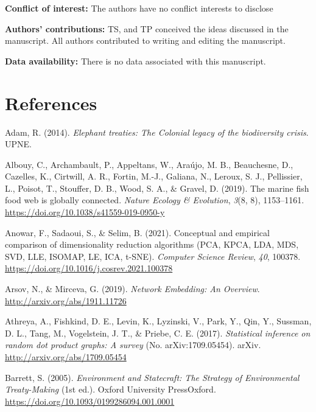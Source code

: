 \documentclass[11pt]{article}
\newlength{\cslhangindent}
\newenvironment{CSLReferences}[2] %
 {%
  \setlength{\parindent}{0pt}
  \ifodd #1 \everypar{\setlength{\hangindent}{\cslhangindent}}\ignorespaces\fi
  \ifnum #2 > 0
  \setlength{\parskip}{#2\baselineskip}
  \fi
 }%
 {}
\begin{document}
\textbf{Conflict of interest:} The authors have no conflict interests to
disclose

\textbf{Authors' contributions:} TS, and TP conceived the ideas
discussed in the manuscript. All authors contributed to writing and
editing the manuscript.

\textbf{Data availability:} There is no data associated with this
manuscript.

\hypertarget{references}{%
\section*{References}\label{references}}

\hypertarget{refs}{}
\begin{CSLReferences}{1}{0}
\leavevmode{}%
Adam, R. (2014). \emph{Elephant treaties: The Colonial legacy of the
biodiversity crisis}. UPNE.

\leavevmode{}%
Albouy, C., Archambault, P., Appeltans, W., Araújo, M. B., Beauchesne,
D., Cazelles, K., Cirtwill, A. R., Fortin, M.-J., Galiana, N., Leroux,
S. J., Pellissier, L., Poisot, T., Stouffer, D. B., Wood, S. A., \&
Gravel, D. (2019). The marine fish food web is globally connected.
\emph{Nature Ecology \& Evolution}, \emph{3}(8, 8), 1153--1161.
\url{https://doi.org/10.1038/s41559-019-0950-y}

\leavevmode{}%
Anowar, F., Sadaoui, S., \& Selim, B. (2021). Conceptual and empirical
comparison of dimensionality reduction algorithms (PCA, KPCA, LDA, MDS,
SVD, LLE, ISOMAP, LE, ICA, t-SNE). \emph{Computer Science Review},
\emph{40}, 100378. \url{https://doi.org/10.1016/j.cosrev.2021.100378}

\leavevmode{}%
Arsov, N., \& Mirceva, G. (2019). \emph{Network Embedding: An Overview}.
\url{http://arxiv.org/abs/1911.11726}

\leavevmode{}%
Athreya, A., Fishkind, D. E., Levin, K., Lyzinski, V., Park, Y., Qin,
Y., Sussman, D. L., Tang, M., Vogelstein, J. T., \& Priebe, C. E.
(2017). \emph{Statistical inference on random dot product graphs: A
survey} (No. arXiv:1709.05454). arXiv.
\url{http://arxiv.org/abs/1709.05454}

\leavevmode{}%
Barrett, S. (2005). \emph{Environment and Statecraft: The Strategy of
Environmental Treaty-Making} (1st ed.). Oxford University PressOxford.
\url{https://doi.org/10.1093/0199286094.001.0001}


\end{CSLReferences}
\end{document}
